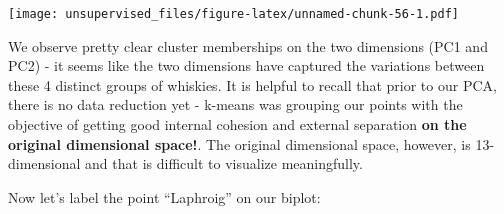 \documentclass[]{article}
\newenvironment{Shaded}{\begin{snugshade}}{\end{snugshade}}
\newcommand{\CommentTok}[1]{\textcolor[rgb]{0.56,0.35,0.01}{\textit{#1}}}
\newcommand{\DataTypeTok}[1]{\textcolor[rgb]{0.13,0.29,0.53}{#1}}
\newcommand{\DecValTok}[1]{\textcolor[rgb]{0.00,0.00,0.81}{#1}}
\newcommand{\FloatTok}[1]{\textcolor[rgb]{0.00,0.00,0.81}{#1}}
\newcommand{\KeywordTok}[1]{\textcolor[rgb]{0.13,0.29,0.53}{\textbf{#1}}}
\newcommand{\NormalTok}[1]{#1}
\newcommand{\OperatorTok}[1]{\textcolor[rgb]{0.81,0.36,0.00}{\textbf{#1}}}
\newcommand{\StringTok}[1]{\textcolor[rgb]{0.31,0.60,0.02}{#1}}
\begin{document}
\texttt{[image: unsupervised\_files/figure-latex/unnamed-chunk-56-1.pdf]}

We observe pretty clear cluster memberships on the two dimensions (PC1
and PC2) - it seems like the two dimensions have captured the variations
between these 4 distinct groups of whiskies. It is helpful to recall
that prior to our PCA, there is no data reduction yet - k-means was
grouping our points with the objective of getting good internal cohesion
and external separation \textbf{on the original dimensional space!}. The
original dimensional space, however, is 13-dimensional and that is
difficult to visualize meaningfully.

Now let's label the point ``Laphroig'' on our biplot:

\begin{Shaded}
\end{Shaded}
\end{document}
